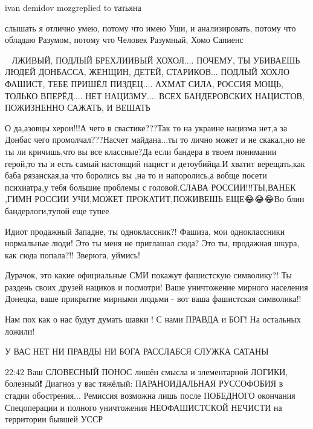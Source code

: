 ivan demidov mozgreplied to татьяна

слышать я отлично умею, потому что имею Уши, и анализировать, потому что
обладаю Разумом, потому что Человек Разумный, Хомо Сапиенс


🤣🤣🤣ЛЖИВЫЙ, ПОДЛЫЙ БРЕХЛИИВЫЙ ХОХОЛ.... ПОЧЕМУ, ТЫ УБИВАЕШЬ ЛЮДЕЙ ДОНБАССА,
ЖЕНЩИН, ДЕТЕЙ, СТАРИКОВ... ПОДЛЫЙ ХОХЛО ФАШИСТ, ТЕБЕ ПРИШЁЛ ПИЗДЕЦ.... АХМАТ
СИЛА, РОССИЯ МОЩЬ, ТОЛЬКО ВПЕРЁД.... НЕТ НАЦИЗМУ.... ВСЕХ БАНДЕРОВСКИХ
НАЦИСТОВ, ПОЖИЗНЕННО САЖАТЬ, И ВЕШАТЬ🤣🤣🤣🤣🤣


О да,азовцы херои!!!А чего в свастике???Так то на украине нацизма нет,а за
Донбас чего промолчал???Насчет майдана...ты то лично может и не скакал,но не ты
ли кричишь,что вы все классные?Да если бандера в твоем понимании герой,то ты и
есть самый настоящий нацист и детоубийца.И хватит верещать,как баба
рязанская,за что боролись вы ,на то и напоролись,а вобще посети психиатра,у
тебя большие проблемы с головой.СЛАВА РОССИИ!!!ТЫ,ВАНЕК ,ГИМН РОССИИ УЧИ,МОЖЕТ
ПРОКАТИТ,ПОЖИВЕШЬ ЕЩЕ😂😂😂Во блин бандерлоги,тупой еще тупее🤦


Идиот продажный Западне, ты одноклассник?! Фашиза, мои одноклассники нормальные
люди! Это ты меня не приглашал сюда? Это ты, продажная шкура, как сюда
попала?!! Зверюга, уймись!


Дурачок, это какие официальные СМИ покажут фашистскую символику?! Ты раздень
своих друзей нациков и посмотри! Ваше уничтожение мирного населения Донецка,
ваше прикрытие мирными людьми - вот ваша фашистская символика!!

Нам пох как о нас будут думать шавки ! С нами ПРАВДА и БОГ! На остальных
ложили!


У ВАС НЕТ НИ ПРАВДЫ НИ БОГА РАССЛАБСЯ СЛУЖКА САТАНЫ

22:42
Ваш СЛОВЕСНЫЙ ПОНОС лишён смысла и элементарной ЛОГИКИ, болезный❗ Диагноз у
вас тяжёлый: ПАРАНОИДАЛЬНАЯ РУССОФОБИЯ в стадии обострения... Ремиссия возможна
лишь после ПОБЕДНОГО окончания Спецоперации и полного уничтожения НЕОФАШИСТСКОЙ
НЕЧИСТИ на территории бывшей УССР

